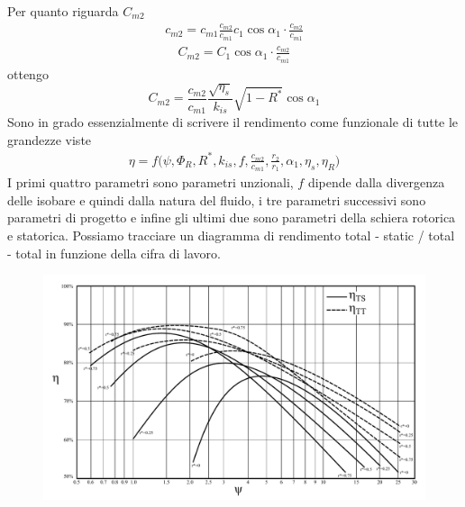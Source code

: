 Per quanto riguarda $C_{m2}$ 
\begin{align*}
c_{m2} = c_{m1} \frac{c_{m2}}{c_{m1}} c_1 \cos \alpha_1 \cdot \frac{c_{m2}}{c_{m1}}
\end{align*}
\begin{align*}
C_{m2} = C_1 \cos \alpha_1 \cdot \frac{c_{m2}}{c_{m1}}
\end{align*}
ottengo
\begin{equation}
\boxed{C_{m2} = \frac{c_{m2}}{c_{m1}} \frac{\sqrt{\eta_s}}{k_{is}} \sqrt{1 - R^*} \cos \alpha_1 }
\end{equation}
Sono in grado essenzialmente di scrivere il rendimento come funzionale di tutte le grandezze viste 
\begin{align*}
\eta = f \bigg( \psi, \Phi_R, R^*, k_{is}, f, \frac{c_{m2}}{c_{m1}}, \frac{r_2}{r_1}, \alpha_1, \eta_s, \eta_R \bigg)
\end{align*}
I primi quattro parametri sono parametri unzionali, $f$ dipende dalla divergenza delle isobare e quindi dalla natura del fluido, i tre parametri successivi sono parametri di progetto e infine gli ultimi due sono parametri della schiera rotorica e statorica.
Possiamo tracciare un diagramma di rendimento total - static / total - total in funzione della cifra di lavoro. 
\begin{figure}
\centering
  \includegraphics[width=.8\textwidth]{fig/Rendimenti_ts_tt.pdf}
\caption{}
\label{fig:Rendimenti_ts_tt}
\end{figure}

